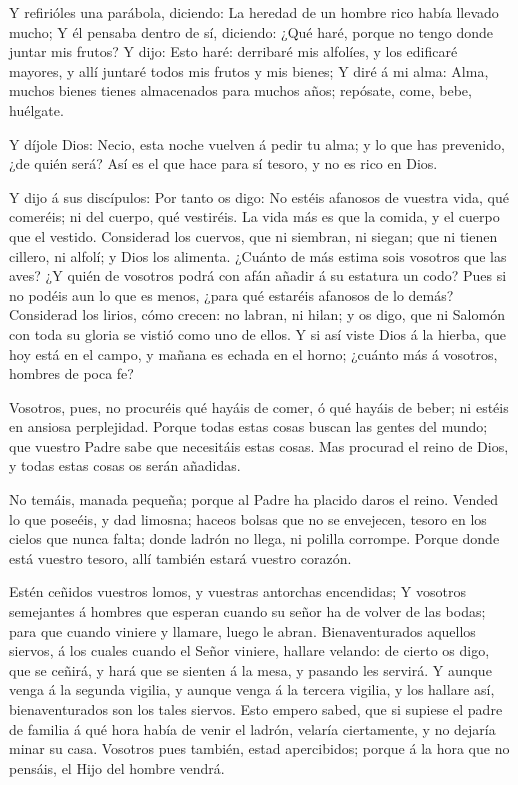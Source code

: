  Y refirióles una parábola, diciendo: La heredad de un
hombre rico había llevado mucho;  Y él pensaba dentro de
sí, diciendo: ¿Qué haré, porque no tengo donde juntar mis frutos?
 Y dijo: Esto haré: derribaré mis alfolíes, y los edificaré
mayores, y allí juntaré todos mis frutos y mis bienes;  Y
diré á mi alma: Alma, muchos bienes tienes almacenados para muchos años;
repósate, come, bebe, huélgate.

 Y díjole Dios: Necio, esta noche vuelven á pedir tu alma;
y lo que has prevenido, ¿de quién será?  Así es el que hace
para sí tesoro, y no es rico en Dios.

 Y dijo á sus discípulos: Por tanto os digo: No estéis
afanosos de vuestra vida, qué comeréis; ni del cuerpo, qué vestiréis.
 La vida más es que la comida, y el cuerpo que el vestido.
 Considerad los cuervos, que ni siembran, ni siegan; que ni
tienen cillero, ni alfolí; y Dios los alimenta. ¿Cuánto de más estima
sois vosotros que las aves?  ¿Y quién de vosotros podrá con
afán añadir á su estatura un codo?  Pues si no podéis aun
lo que es menos, ¿para qué estaréis afanosos de lo demás? 
Considerad los lirios, cómo crecen: no labran, ni hilan; y os digo, que
ni Salomón con toda su gloria se vistió como uno de ellos. 
Y si así viste Dios á la hierba, que hoy está en el campo, y mañana es
echada en el horno; ¿cuánto más á vosotros, hombres de poca fe?

 Vosotros, pues, no procuréis qué hayáis de comer, ó qué
hayáis de beber; ni estéis en ansiosa perplejidad.  Porque
todas estas cosas buscan las gentes del mundo; que vuestro Padre sabe
que necesitáis estas cosas.  Mas procurad el reino de Dios,
y todas estas cosas os serán añadidas.

 No temáis, manada pequeña; porque al Padre ha placido
daros el reino.  Vended lo que poseéis, y dad limosna;
haceos bolsas que no se envejecen, tesoro en los cielos que nunca falta;
donde ladrón no llega, ni polilla corrompe.  Porque donde
está vuestro tesoro, allí también estará vuestro corazón.

 Estén ceñidos vuestros lomos, y vuestras antorchas
encendidas;  Y vosotros semejantes á hombres que esperan
cuando su señor ha de volver de las bodas; para que cuando viniere y
llamare, luego le abran.  Bienaventurados aquellos siervos,
á los cuales cuando el Señor viniere, hallare velando: de cierto os
digo, que se ceñirá, y hará que se sienten á la mesa, y pasando les
servirá.  Y aunque venga á la segunda vigilia, y aunque
venga á la tercera vigilia, y los hallare así, bienaventurados son los
tales siervos.  Esto empero sabed, que si supiese el padre
de familia á qué hora había de venir el ladrón, velaría ciertamente, y
no dejaría minar su casa.  Vosotros pues también, estad
apercibidos; porque á la hora que no pensáis, el Hijo del hombre vendrá.

